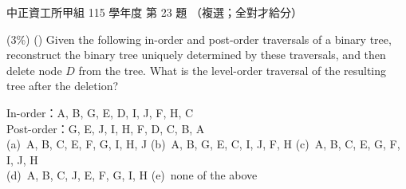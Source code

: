 \begin{pastexam}[label={px:ccu-115-swa-13}]{中正資工所甲組 115 學年度 第 23 題}
（複選；全對才給分）

(3\%) (\qquad) Given the following in-order and post-order traversals of a binary tree, reconstruct
the binary tree uniquely determined by these traversals, and then delete node $D$ from the tree.
What is the level-order traversal of the resulting tree after the deletion?

In-order：A, B, G, E, D, I, J, F, H, C\\
Post-order：G, E, J, I, H, F, D, C, B, A\\
(a)~A, B, C, E, F, G, I, H, J \qquad (b)~A, B, G, E, C, I, J, F, H \qquad
(c)~A, B, C, E, G, F, I, J, H\\
(d)~A, B, C, J, E, F, G, I, H \qquad (e)~none of the above
\end{pastexam}

